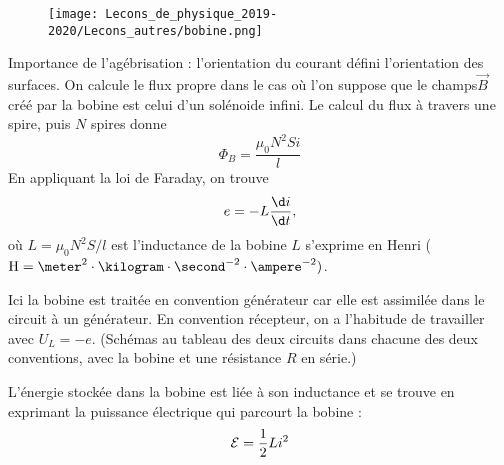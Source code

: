 \begin{figure}[!h]
\center
\texttt{[image: Lecons\_de\_physique\_2019-2020/Lecons\_autres/bobine.png]}
\end{figure}

Importance de l'agébrisation : l'orientation du courant défini l'orientation des surfaces.
On calcule le flux propre dans le cas où l'on suppose que le champs$\overrightarrow{B}$ créé par la bobine est celui d'un solénoide infini.
Le calcul du flux à travers une spire, puis $N$ spires donne
\begin{equation}
\Phi_B = \frac{\mu_0 N^2 S i}{l}
\end{equation}
En appliquant la loi de Faraday, on trouve
\begin{equation}
e = -L\frac{\d i}{\d t},
\end{equation}
où $L = \mu_0 N^2 S/l$ est l'inductance de la bobine  
$L$ s'exprime en Henri ($\mathrm{H}=\meter^2\cdot\kilogram\cdot\second^{-2}\cdot\ampere^{-2})$.

Ici la bobine est traitée en convention générateur car elle est assimilée dans le circuit à un générateur.
En convention récepteur, on a l'habitude de travailler avec $U_L = -e$.
(Schémas au tableau des deux circuits dans chacune des deux conventions, avec la bobine et une résistance $R$ en série.)

L'énergie stockée dans la bobine est liée à son inductance et se trouve en exprimant la puissance électrique qui parcourt la bobine :
\begin{equation}
{\cal{E}} = \frac{1}{2}Li^2
\end{equation}

